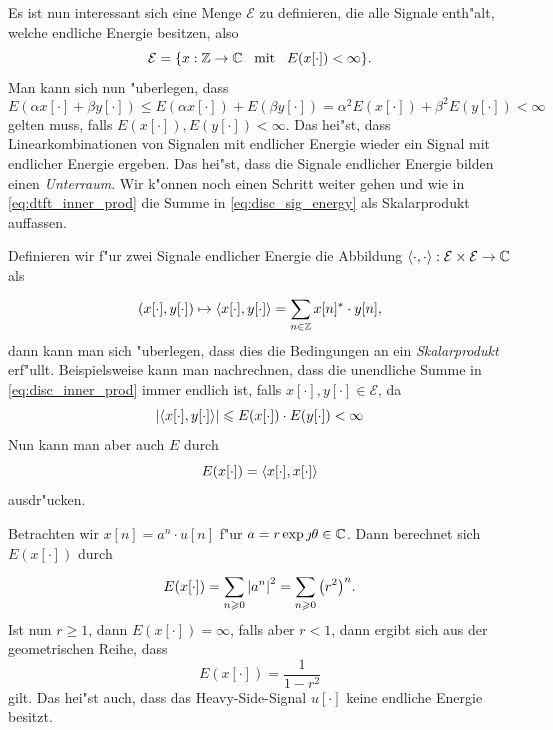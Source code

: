 Es ist nun interessant sich eine Menge $\mathcal{E}$ zu definieren, die alle Signale enth"alt, welche endliche Energie besitzen, also 
\[
    \mathcal{E} = \{x : \mathbb{Z} \rightarrow \mathbb{C} {\hspace{3mm} \text{mit} \hspace{3mm}} E(x[\cdot]) < \infty\}.
\]
Man kann sich nun "uberlegen, dass
\[
E(\alpha x[\cdot] + \beta y[\cdot]) 
    \leqslant E(\alpha x[\cdot]) + E(\beta y[\cdot])
    = \alpha^2 E(x[\cdot]) + \beta^2 E(y[\cdot]) 
    < \infty 
\]
gelten muss, falls $E(x[\cdot]),E(y[\cdot]) < \infty$. 
Das hei"st, dass Linearkombinationen von Signalen mit endlicher Energie wieder ein Signal mit endlicher Energie ergeben.
Das hei"st, dass die Signale endlicher Energie bilden einen \emph{Unterraum}.
Wir k"onnen noch einen Schritt weiter gehen und wie in \eqref{eq:dtft_inner_prod} die Summe in \eqref{eq:disc_sig_energy} als Skalarprodukt auffassen.

Definieren wir f"ur zwei Signale endlicher Energie die Abbildung ${\left\langle \cdot,\cdot \right\rangle} : \mathcal{E} \times \mathcal{E} \rightarrow \mathbb{C}$ als
\begin{equation}\label{eq:disc_inner_prod}
    (x[\cdot], y[\cdot]) 
        \mapsto {\left\langle x[\cdot],y[\cdot] \right\rangle}
        = {\sum\limits_{n \in \mathbb{Z}}^{}{x[n]^\ast \cdot y[n]}},
\end{equation}
dann kann man sich "uberlegen, dass dies die Bedingungen an ein \emph{Skalarprodukt} erf"ullt.
Beispielsweise kann man nachrechnen, dass die unendliche Summe in \eqref{eq:disc_inner_prod} immer endlich ist, falls $x[\cdot], y[\cdot] \in \mathcal{E}$, da
\[
{\left| {\left\langle x[\cdot],y[\cdot] \right\rangle} \right|} \leqslant E(x[\cdot]) \cdot E(y[\cdot]) < \infty
\]
Nun kann man aber auch $E$ durch
\[
E(x[\cdot]) = {\left\langle x[\cdot],x[\cdot] \right\rangle}
\] 
ausdr"ucken.

\begin{Bsp}
Betrachten wir $x[n] = a^n \cdot u[n]$ f"ur $a = r \exp{\jmath \theta} \in \mathbb{C}$.
Dann berechnet sich $E(x[\cdot])$ durch
\[
E(x[\cdot]) 
    = {\sum\limits_{n \geqslant 0}^{}{{\left| a^n \right|}^2}} 
    = {\sum\limits_{n \geqslant 0}^{}{\left(r^2\right)^n}}.
\]
Ist nun $r \geqslant 1$, dann $E(x[\cdot]) = \infty$, falls aber $r < 1$, dann ergibt sich aus der geometrischen Reihe, dass
\[
    E(x[\cdot]) = \frac{1}{1 - r^2}
\]
gilt.
Das hei"st auch, dass das Heavy-Side-Signal $u[\cdot]$ keine endliche Energie besitzt.
\end{Bsp}
%
